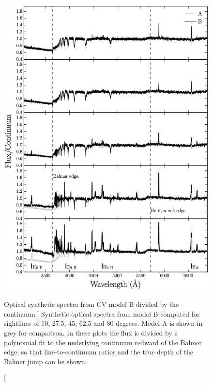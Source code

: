 \begin{figure} 
\centering
\includegraphics[width=1.0\textwidth]{figures/05-cvpaper/modelb_opt_cont.png}
\caption
[Optical synthetic spectra from CV model B divided by the continuum.]{
Synthetic optical spectra from model B computed for 
sightlines of 10, 27.5, 45, 62.5 and 80 degrees. 
Model A is shown in grey for comparison.
In these plots the flux is divided by a polynomial fit to the 
underlying continuum redward of the Balmer edge, so that 
line-to-continuum ratios and the true depth of the
Balmer jump can be shown.
}
\label{continuumb}
\end{figure} 


